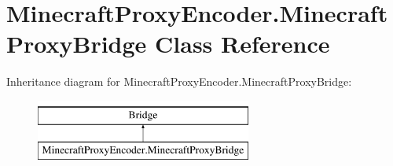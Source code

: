 \hypertarget{classMinecraftProxyEncoder_1_1MinecraftProxyBridge}{\section{Minecraft\-Proxy\-Encoder.\-Minecraft\-Proxy\-Bridge Class Reference}
\label{classMinecraftProxyEncoder_1_1MinecraftProxyBridge}
}
Inheritance diagram for Minecraft\-Proxy\-Encoder.\-Minecraft\-Proxy\-Bridge\-:\begin{figure}[H]
\begin{center}
\leavevmode
\includegraphics[height=2.000000cm]{classMinecraftProxyEncoder_1_1MinecraftProxyBridge}
\end{center}
\end{figure}

